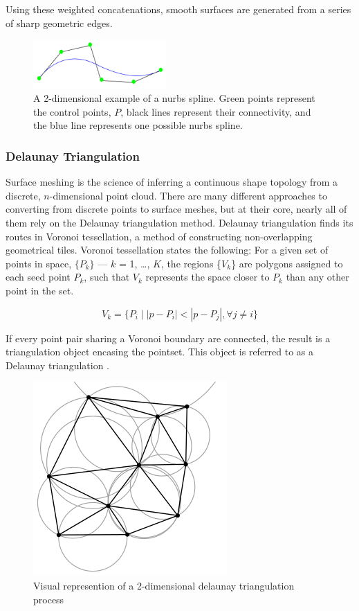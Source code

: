 \documentclass[12pt]{drexelthesis}
\let\Oldsubsubsection\subsubsection
\renewcommand{\subsubsection}{\FloatBarrier\Oldsubsubsection}
\begin{document}
Using these weighted concatenations, smooth surfaces are generated from a series of sharp geometric edges.


\begin{figure}[!ht]
	\centering
		\includegraphics[width=2in]{cadTypes/nurbs.png}
	\caption[Example of a 2-dimensional nurbs spline.]{\centering A 2-dimensional example of a nurbs spline. Green points represent the control points, $P$, black lines represent their connectivity, and the blue line represents one possible nurbs spline.}
\end{figure}


\subsubsection{Delaunay Triangulation}
\label{subsubsec:delaunay}
Surface meshing is the science of inferring a continuous shape topology from a discrete, $n$-dimensional point cloud. There are many different approaches to converting from discrete points to surface meshes, but at their core, nearly all of them rely on the Delaunay triangulation method.
Delaunay triangulation finds its routes in Voronoi tessellation, a method of constructing non-overlapping geometrical tiles. Voronoi tessellation states the following:
For a given set of points in space, $\{P_{k}\}$ --- $k$ = 1, \ldots, $K$, the regions \{$V_{k}$\} are polygons assigned to each seed point $P_{k}$, such that $V_{k}$ represents the space closer to $P_{k}$ than any other point in the set.

\begin{equation}
	V_{k} = \{P_{i} \mid |p - P_{i}| < |p - P_{j}|, \forall j \neq i \}
\end{equation}

If every point pair sharing a Voronoi boundary are connected, the result is a triangulation object encasing the pointset. This object is referred to as a Delaunay triangulation \cite{RN65}.

\begin{figure}[!ht]
\centering
\includegraphics{delaunay.png}
\caption[2D delaunay triangulation]{\centering Visual represention of a 2-dimensional delaunay triangulation process}
\end{figure}
\end{document}
